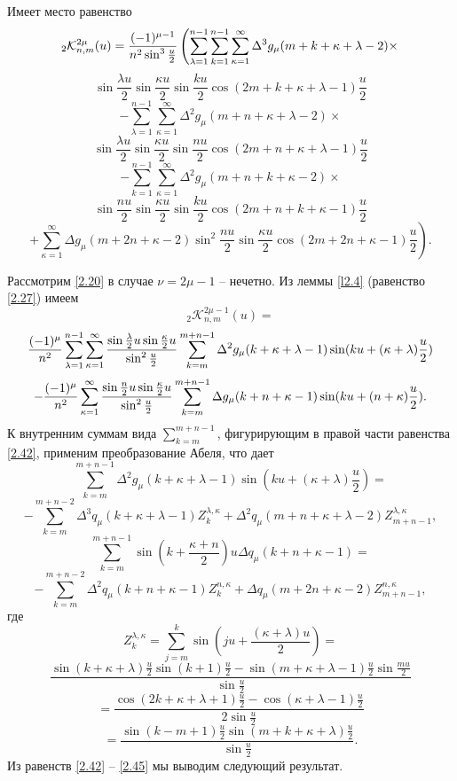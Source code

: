 \begin{lemma}\label{l2.5}
Имеет место равенство
$$
_2\mathcal{ K}_{n,m}^{2\mu}(u)={(-1)^{\mu-1}\over n^2\sin^3\frac{u}{2}}\left(\sum\limits_{\lambda=1}^{n-1}\sum_{k=1}^{n-1}
\sum\limits_{\kappa=1}^{\infty}\Delta^3g_\mu(m+k+\kappa+\lambda-2)\times\right.
$$
$$
\sin\frac{\lambda u}{2}\sin\frac{\kappa u}{2}\sin\frac{ku}{2}\cos(2m+k+\kappa+\lambda-1)\frac{u}{2}
$$
$$
 -\sum\limits_{\lambda=1}^{n-1}
\sum\limits_{\kappa=1}^{\infty}\Delta^2g_\mu(m+n+\kappa+\lambda-2)\times
$$
$$
\sin\frac{\lambda u}{2}\sin\frac{\kappa u}{2}\sin\frac{nu}{2}\cos(2m+n+\kappa+\lambda-1)\frac{u}{2}
$$
$$
 -\sum_{k=1}^{n-1}
\sum\limits_{\kappa=1}^{\infty}\Delta^2g_\mu(m+n+k+\kappa-2)\times
$$
$$
\sin\frac{nu}{2}\sin\frac{\kappa u}{2}\sin\frac{ku}{2}\cos(2m+n+k+\kappa-1)\frac{u}{2}
$$
$$
 \left.+\sum\limits_{\kappa=1}^{\infty}\Delta g_\mu(m+2n+\kappa-2)
\sin^2\frac{nu}{2}\sin\frac{\kappa u}{2}\cos(2m+2n+\kappa-1)\frac{u}{2}\right).
$$
\end{lemma}
Рассмотрим \eqref{2.20} в случае $\nu=2\mu-1$ --  нечетно. Из леммы \ref{l2.4} (равенство \eqref{2.27}) имеем
$$
 _2\mathcal{ K}_{n,m}^{2\mu-1}(u)=
 $$
 $$
 {(-1)^\mu\over n^2}\sum\limits_{\lambda=1}^{n-1}
\sum\limits_{\kappa=1}^{\infty}\frac{\sin\frac{\lambda}{2}u\sin\frac{\kappa}{2}u}
{\sin^2\frac u2}
\sum_{k=m}^{m+n-1}\Delta^2g_\mu(k+\kappa+\lambda-1)\sin(ku+(\kappa+\lambda)\frac{u}{2})
$$
 \begin{equation}\label{2.42}
    -{(-1)^{\mu}\over n^2}\sum\limits_{\kappa=1}^{\infty}
\frac{\sin\frac {n}{2}u\sin\frac{\kappa}{2}u}{\sin^2\frac u2}
\sum_{k=m}^{m+n-1}\Delta g_\mu(k+n+\kappa-1)\sin(ku+(n+\kappa)\frac{u}{2}).
 \end{equation}
К внутренним суммам вида $\sum_{k=m}^{m+n-1}$, фигурирующим в правой части равенства \eqref{2.42}, применим преобразование Абеля, что дает
 $$
 \sum_{k=m}^{m+n-1}\Delta^2g_\mu(k+\kappa+\lambda-1)\sin(ku+(\kappa+\lambda)\frac{u}{2})=
 $$
 \begin{equation}\label{2.43}
-\sum_{k=m}^{m+n-2}\Delta^3q_\mu(k+\kappa+\lambda-1)Z_k^{\lambda,\kappa}
+\Delta^2q_\mu(m+n+\kappa+\lambda-2)Z_{m+n-1}^{\lambda,\kappa},
\end{equation}
$$
\sum_{k=m}^{m+n-1}\sin(k+\frac{\kappa+n}{2})u\Delta q_\mu(k+n+\kappa-1)=
$$
 \begin{equation}\label{2.44}
-\sum_{k=m}^{m+n-2}\Delta^2q_\mu(k+n+\kappa-1)Z_k^{n,\kappa}
+\Delta q_\mu(m+2n+\kappa-2)Z_{m+n-1}^{n,\kappa},
    \end{equation}
где
$$
Z_k^{\lambda,\kappa}=\sum_{j=m}^k \sin(ju+\frac{(\kappa+\lambda)u}{2})=
$$
$$
\frac{\sin(k+\kappa+\lambda)\frac{u}{2}\sin(k+1)\frac{u}{2}-
\sin(m+\kappa+\lambda-1)\frac{u}{2}\sin\frac{mu}{2}}{\sin\frac{u}{2}}
$$
$$
=\frac{\cos(2k+\kappa+\lambda+1)\frac{u}{2}-\cos(\kappa+\lambda-1)\frac{u}{2}}{2\sin\frac{u}{2}}
$$
 \begin{equation}\label{2.45}
=\frac{\sin(k-m+1)\frac{u}{2}\sin(m+k+\kappa+\lambda)\frac{u}{2}}{\sin\frac{u}{2}}.
    \end{equation}
Из равенств \eqref{2.42} -- \eqref{2.45} мы выводим следующий результат.

